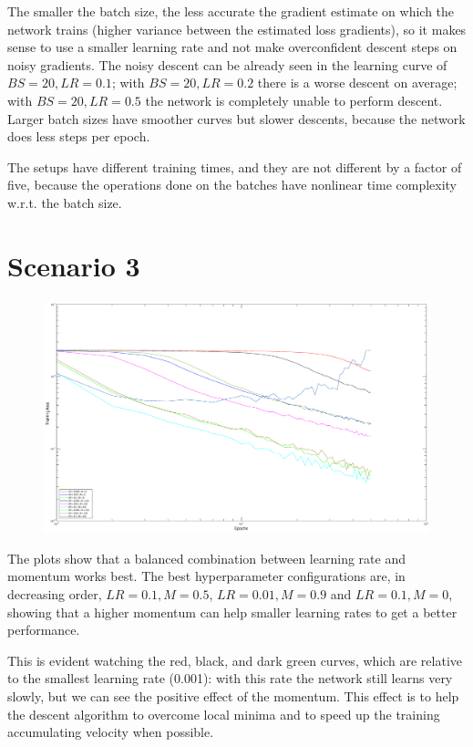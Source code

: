 \documentclass{article}
\begin{document}
    The smaller the batch size, the less accurate the gradient estimate on which the network trains (higher variance between the estimated loss gradients), so it makes sense to use a smaller learning rate
    and not make overconfident descent steps on noisy gradients. The noisy descent can be already seen in the learning curve of $BS = 20, LR = 0.1$; with $BS = 20, LR = 0.2$ there is a worse descent on average; 
    with $BS = 20, LR = 0.5$ the network is completely unable to perform descent. Larger batch sizes have smoother curves but slower descents, because the network does less steps per epoch.
    
    The setups have different training times, and they are not different by a factor of five, because the operations done on the batches have nonlinear time complexity w.r.t. the batch size.
    
    
    
\section*{Scenario 3}
	\begin{figure}[!htb]
        \centering
        \includegraphics[width=\textwidth]{figures/sc3_tr_loss}
    \end{figure}
    
    The plots show that a balanced combination between learning rate and momentum works best. The best hyperparameter configurations are, in decreasing order, 
    $LR = 0.1, M = 0.5$, $LR = 0.01, M = 0.9$ and $LR = 0.1, M = 0$, showing that a higher momentum can help smaller learning rates to get a better performance. 
    
    This is evident watching the red, black, and dark green curves, which are relative to the smallest learning rate (0.001): with this rate the network still learns very slowly, but we can see the positive effect of the momentum. 
    This effect is to help the descent algorithm to overcome local minima and to speed up the training accumulating velocity when possible.
    
\end{document}
